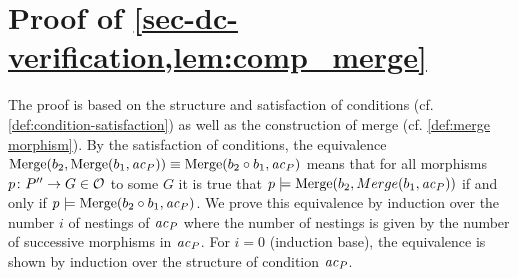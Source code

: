 \section{Proof of \cref{sec-dc-verification,lem:comp_merge}}
\label{sec-proofs:lem:comp_merge}
The proof is based on the structure and satisfaction of conditions (cf. \cref{def:condition-satisfaction}) as well as the construction of merge (cf. \cref{def:merge morphism}).\thispagestyle{plain}
By the satisfaction of conditions, the equivalence $\mathrm{Merge}(b_2,\mathrm{Merge}(b_1,\mathit{ac}_P)) \equiv \mathrm{Merge}(b_2 \circ b_1,\mathit{ac}_P)$ means that for all morphisms $p\colon P'' \to G \in {\cal O}$ to some $G$ it is true that $p \models \mathrm{Merge}(b_2,Merge(b_1,\mathit{ac}_P))$ if and only if $p \models \mathrm{Merge}(b_2 \circ b_1,\mathit{ac}_P)$.
We prove this equivalence by induction over the number $i$ of nestings of $\mathit{ac}_P$ where the number of nestings is given by the number of successive morphisms in $\mathit{ac}_P$.
For $i=0$ (induction base), the equivalence is shown by induction over the structure of condition $\mathit{ac}_P$.
